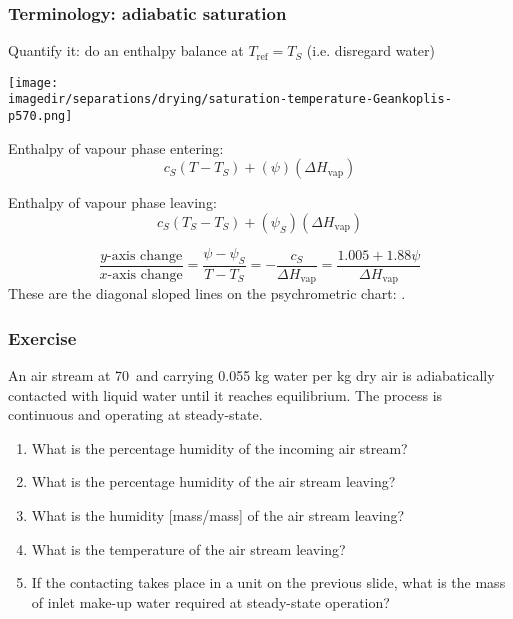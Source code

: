 \begin{frame}\frametitle{Terminology: adiabatic saturation}
	Quantify it: do an enthalpy balance at $T_\text{ref} = T_S$ {\scriptsize (i.e. disregard water)}
	\begin{center}
		\texttt{[image: \\imagedir/separations/drying/saturation-temperature-Geankoplis-p570.png]}
	\end{center}
	\vspace{-6pt}
	\begin{exampleblock}{Enthalpy of vapour phase entering:}
		\[c_S\left(T - T_S \right) + (\psi) (\Delta H_\text{vap})\]
	\end{exampleblock}
	\begin{exampleblock}{Enthalpy of vapour phase leaving:}
		\[c_S\left(T_S - T_S \right) + (\psi_S) (\Delta H_\text{vap})\]
	\end{exampleblock}
	
	\[	
		\displaystyle \frac{y\text{-axis change}}{x\text{-axis change}} = \frac{\psi - \psi_S}{T - T_S} = - \frac{c_S}{\Delta H_\text{vap}} = \frac{1.005 + 1.88 \psi}{\Delta H_\text{vap}}
	\]
	These are the diagonal sloped lines on the psychrometric chart: {\color{purple}{adiabatic saturation curves}}.
\end{frame}

\begin{frame}\frametitle{Exercise}
	An air stream at 70\degC$\,$ and carrying 0.055 kg water per kg dry air is adiabatically contacted with liquid water until it reaches equilibrium. The process is continuous and operating at steady-state.
	
	\begin{enumerate}
		\item	What is the percentage humidity of the incoming air stream?
		\item	What is the percentage humidity of the air stream leaving?
		\item	What is the humidity [mass/mass] of the air stream leaving?
		\item	What is the temperature of the air stream leaving?
		\item	If the contacting takes place in a unit on the previous slide, what is the mass of inlet make-up water required at steady-state operation?
	\end{enumerate}
\end{frame}


% 	

